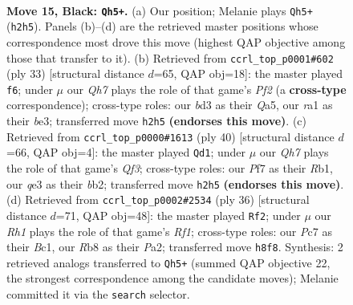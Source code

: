 \documentclass[11pt]{article}
\begin{document}
\clearpage

\begin{figure}[p]\centering
\begin{subfigure}{0.46\textwidth}\centering
\resizebox{\linewidth}{!}{%
\newchessgame
\chessboard[
  setfen={1rb1k2r/p1pp1pp1/2p4p/4P3/8/P2BQ3/P1P4q/R2KR3 b k - 1 15},
  showmover=false,
  pgfstyle=straightmove, color=movearrow, markmove={h2-h5}
]}
\caption{}
\end{subfigure}\hfill
\begin{subfigure}{0.46\textwidth}\centering
\resizebox{\linewidth}{!}{%
\newchessgame
\chessboard[
  setfen={1r2kb1r/p4ppp/2p1P3/q2p4/6Q1/4BP2/PP3P1P/2KR3R b k - 0 17},
  showmover=false,
  pgfstyle=straightmove, color=movearrow, markmove={f7-f6}
]}
\caption{}
\end{subfigure}
\\[4pt]
\begin{subfigure}{0.46\textwidth}\centering
\resizebox{\linewidth}{!}{%
\newchessgame
\chessboard[
  setfen={r1q1r1k1/5ppp/p2B4/3R4/1p2P3/5Q2/Pb3PPP/1R4K1 w - - 2 21},
  showmover=false,
  pgfstyle=straightmove, color=movearrow, markmove={f3-d1}
]}
\caption{}
\end{subfigure}\hfill
\begin{subfigure}{0.46\textwidth}\centering
\resizebox{\linewidth}{!}{%
\newchessgame
\chessboard[
  setfen={4r1k1/1RQ2pp1/r7/p2pPb1q/5P2/8/P1P3PP/2B2RK1 w - - 1 19},
  showmover=false,
  pgfstyle=straightmove, color=movearrow, markmove={f1-f2}
]}
\caption{}
\end{subfigure}
\caption{\textbf{Move 15, Black: \texttt{Qh5+}.} (a) Our position; Melanie plays \texttt{Qh5+} (\texttt{h2h5}). Panels (b)--(d) are the retrieved master positions whose correspondence most drove this move (highest QAP objective among those that transfer to it). (b) Retrieved from \texttt{ccrl\_top\_p0001\#602} (ply 33) [structural distance $d$=65, QAP obj=18]: the master played \texttt{f6}; under $\mu$ our \emph{Qh7} plays the role of that game's \emph{Pf2} (a \textbf{cross-type} correspondence); cross-type roles: our \emph{b}d3 as their \emph{Q}a5, our \emph{r}a1 as their \emph{b}e3; transferred move \texttt{h2h5} \textbf{(endorses this move)}. (c) Retrieved from \texttt{ccrl\_top\_p0000\#1613} (ply 40) [structural distance $d$=66, QAP obj=4]: the master played \texttt{Qd1}; under $\mu$ our \emph{Qh7} plays the role of that game's \emph{Qf3}; cross-type roles: our \emph{P}f7 as their \emph{R}b1, our \emph{q}e3 as their \emph{b}b2; transferred move \texttt{h2h5} \textbf{(endorses this move)}. (d) Retrieved from \texttt{ccrl\_top\_p0002\#2534} (ply 36) [structural distance $d$=71, QAP obj=48]: the master played \texttt{Rf2}; under $\mu$ our \emph{Rh1} plays the role of that game's \emph{Rf1}; cross-type roles: our \emph{P}c7 as their \emph{B}c1, our \emph{R}b8 as their \emph{P}a2; transferred move \texttt{h8f8}. Synthesis: 2 retrieved analogs transferred to \texttt{Qh5+} (summed QAP objective 22, the strongest correspondence among the candidate moves); Melanie committed it via the \texttt{search} selector.}
\label{fig:thought-m29}
\end{figure}
\end{document}
